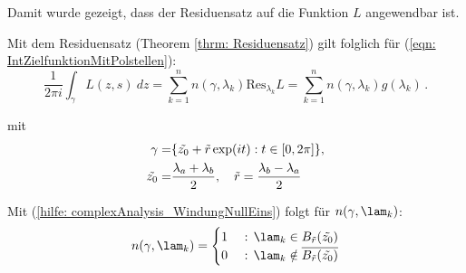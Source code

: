 \documentclass[a4paper,12pt]{report}
\newcommand{\C}{\mathbb C}
\newcommand{\1}{\mathds{1}}
\newcommand{\Res}{\text{Res}}
\theoremstyle{plain} %
\theoremstyle{definition} %
\theoremstyle{remark}
\begin{document}
\begin{itemize}


            \end{itemize}

            Damit wurde gezeigt, dass der Residuensatz auf die Funktion $L$ angewendbar ist.

            Mit dem Residuensatz (Theorem \ref{thrm: Residuensatz}) gilt folglich für (\ref{eqn: IntZielfunktionMitPolstellen}):
            $$\frac 1 {2\pi i}\int_\gamma L(z,s)\ dz = \sum_{k=1}^{n} n(\gamma, \lambda_k) \Res_{\lambda_k}L = \sum_{k=1}^{n} n(\gamma, \lambda_k) g(\lambda_k)\,.$$

            mit \begin{align}
                  \gamma =& \{\Tilde{z_0} + \Tilde r\exp(i t): t\in [0,2\pi]\},\label{def: gamma}\\
                  \Tilde{z_0} =& \frac {\lambda_a+\lambda_b} {2},\quad\Tilde r = \frac {\lambda_b-\lambda_a} {2}\nonumber
            \end{align}

            Mit (\ref{hilfe: complexAnalysis_WindungNullEins}) folgt für $n(\gamma, \lam_k)$:
            $$n(\gamma, \lam_k) = \begin{cases}
                  1& \text{ : }\lam_k\in B_{\Tilde{r}}(\Tilde{z_0})\\
                  0& \text{ : }\lam_k\notin\overline {B_{\Tilde{r}}(\Tilde{z_0})}
            \end{cases}$$
            
\end{document}
